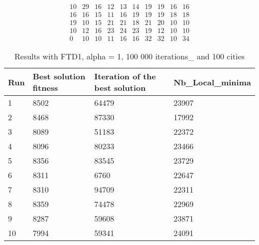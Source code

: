 \documentclass[12pt,oneside,a4paper]{article}
\begin{document}
\begin{equation}
  \tag{Mean Tabu Duration by city table 12}
  \begin{smallmatrix} 10 & 29 & 16 & 12 & 13 & 14 & 19 & 19 & 16 & 16 \\
    16 & 16 & 15 & 11 & 16 & 19 & 19 & 19 & 18 & 18 \\
    19 & 10 & 15 & 21 & 21 & 18 & 21 & 20 & 10 & 10 \\
    10 & 12 & 16 & 23 & 24 & 23 & 19 & 12 & 10 & 10 \\
    0 & 10 & 10 & 11 & 16 & 16 & 32 & 32 & 10 & 34
  \end{smallmatrix}
\end{equation}

\begin{table}[h]
  \centering
  \small
  \begin{tabular}{llll}
    \hline
    \multicolumn{1}{|l|}{\textbf{Run}}& \multicolumn{1}{l|}{\textbf{Best solution fitness}}& \multicolumn{1}{l|}{\textbf{Iteration of the best solution}}& \multicolumn{1}{l|}{\textbf{Nb\_Local\_minima}}\\ \hline
    \multicolumn{1}{|l|}{1} & \multicolumn{1}{l|}{8502}  & \multicolumn{1}{l|}{64479} & \multicolumn{1}{l|}{23907}  \\ \hline
    \multicolumn{1}{|l|}{2} & \multicolumn{1}{l|}{8468}  & \multicolumn{1}{l|}{87330} & \multicolumn{1}{l|}{17992}  \\ \hline
    \multicolumn{1}{|l|}{3} & \multicolumn{1}{l|}{8089}  & \multicolumn{1}{l|}{51183}  & \multicolumn{1}{l|}{22372}  \\ \hline
    \multicolumn{1}{|l|}{4} & \multicolumn{1}{l|}{8096}  & \multicolumn{1}{l|}{80233}  & \multicolumn{1}{l|}{23466}  \\ \hline
    \multicolumn{1}{|l|}{5} & \multicolumn{1}{l|}{8356}  & \multicolumn{1}{l|}{83545}  & \multicolumn{1}{l|}{23729}  \\ \hline
    \multicolumn{1}{|l|}{6} & \multicolumn{1}{l|}{8311}  & \multicolumn{1}{l|}{6760}  & \multicolumn{1}{l|}{22647}  \\ \hline
    \multicolumn{1}{|l|}{7} & \multicolumn{1}{l|}{8310}  & \multicolumn{1}{l|}{94709}  & \multicolumn{1}{l|}{22311}  \\ \hline
    \multicolumn{1}{|l|}{8} & \multicolumn{1}{l|}{8359}  & \multicolumn{1}{l|}{74478} & \multicolumn{1}{l|}{22969}  \\ \hline
    \multicolumn{1}{|l|}{9} & \multicolumn{1}{l|}{8287}  & \multicolumn{1}{l|}{59608} & \multicolumn{1}{l|}{23871}  \\ \hline
    \multicolumn{1}{|l|}{10} & \multicolumn{1}{l|}{7994}  & \multicolumn{1}{l|}{59341} & \multicolumn{1}{l|}{24091}  \\ \hline
  \end{tabular}
  \caption{Results with FTD1, alpha = 1, 100 000 iterations\_ and 100 cities}
\end{table}
\end{document}

